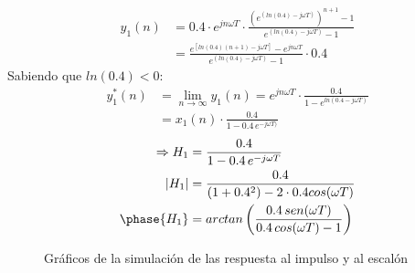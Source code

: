 \documentclass[../../guia1.tex]{subfiles}
\begin{document}
\begin{align*}
	y_1(n) &= 0.4\cdot e^{jn\omega T}\cdot \frac{\left({e^{(ln(0.4)-j\omega T)}}\right)^{n+1}-1}{e^{(ln(0.4)-j\omega T)}-1}\\
		&= \frac{e^{[ln(0.4)(n+1)-j\omega T]} - e^{jn\omega T}}{e^{(ln(0.4)-j\omega T)}-1}\cdot 0.4
\end{align*}
Sabiendo que $ln(0.4) < 0$:
\begin{align*}
	y_1^*(n) &= \lim_{n\rightarrow \infty} y_1(n) = e^{jn\omega T}\cdot \frac{0.4}{1-e^{ln(0.4 - j\omega T)}}\\
			&= x_1(n)\cdot  \frac{0.4}{1-0.4 \,e^{- j\omega T)}}
\end{align*}
\begin{align*}
	\Rightarrow H_1 &= \frac{0.4}{1-0.4\,e^{-j\omega T}}\\
	|H_1| &= \frac{0.4}{(1+0.4^2)-2\cdot 0.4 cos(\omega T)}\\
	\phase{H_1} &= arctan\left( \frac{0.4\, sen(\omega T)}{0.4\, cos(\omega T) - 1} \right)
\end{align*}

\begin{figure}[H]
 \centering

 \caption{Gráficos de la simulación de las respuesta al impulso y al escalón}
 \label{f:eja}
\end{figure}
\end{document}
